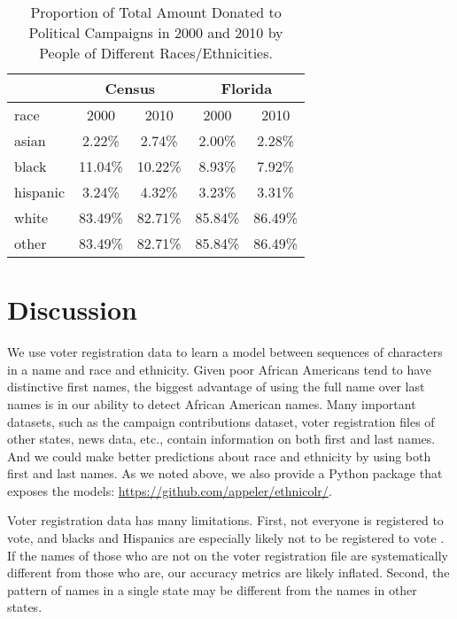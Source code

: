 \documentclass[12pt, letterpaper]{article}
\begin{document}
\begin{table}[h!]
\centering
\caption{Proportion of Total Amount Donated to Political Campaigns in 2000 and 2010 by People of Different Races/Ethnicities.}
\begin{tabular}{ l c c c c}
\hline
         & \multicolumn{2}{c}{Census} & \multicolumn{2}{c}{Florida}\\
\hline
race     &     2000     & 2010     &    2000    & 2010\\    
\hline
asian    &     2.22\%   & 2.74\%   &   2.00\%   & 2.28\%\\
black    &     11.04\%  & 10.22\%  &   8.93\%   & 7.92\%\\
hispanic &     3.24\%   & 4.32\%   &   3.23\%   & 3.31\%\\
white    &     83.49\%  & 82.71\%  &   85.84\%  & 86.49\%\\
other    &     83.49\%  & 82.71\%  &   85.84\%  & 86.49\%\\
\hline
\end{tabular}
\label{table:percentage_contrib_by_race}
\end{table}

\section*{Discussion}
We use voter registration data to learn a model between sequences of characters in a name and race and ethnicity. Given poor African Americans tend to have distinctive first names, the biggest advantage of using the full name over last names is in our ability to detect African American names. Many important datasets, such as the campaign contributions dataset, voter registration files of other states, news data, etc., contain information on both first and last names. And we could make better predictions about race and ethnicity by using both first and last names. As we noted above, we also provide a Python package that exposes the models: \url{https://github.com/appeler/ethnicolr/}.

Voter registration data has many limitations. First, not everyone is registered to vote, and blacks and Hispanics are especially likely not to be registered to vote \citep{ansolabehere2011gender}. If the names of those who are not on the voter registration file are systematically different from those who are, our accuracy metrics are likely inflated. Second, the pattern of names in a single state may be different from the names in other states. 

\clearpage


\clearpage
\end{document}
